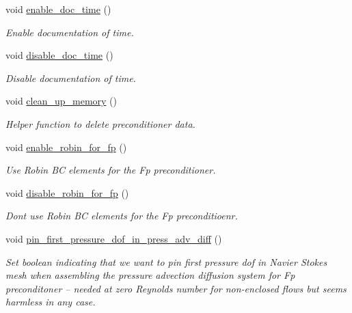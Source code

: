 \begin{DoxyCompactItemize}
void \hyperlink{classoomph_1_1NavierStokesSchurComplementPreconditioner_af1a6030468c5795b3ace7a58bcb6b4f1}{enable\+\_\+doc\+\_\+time} ()
\begin{DoxyCompactList}\small\item\em Enable documentation of time. \end{DoxyCompactList}\item 
void \hyperlink{classoomph_1_1NavierStokesSchurComplementPreconditioner_ae0015b71a33a147650606840d98f5a9e}{disable\+\_\+doc\+\_\+time} ()
\begin{DoxyCompactList}\small\item\em Disable documentation of time. \end{DoxyCompactList}\item 
void \hyperlink{classoomph_1_1NavierStokesSchurComplementPreconditioner_a5cac2493de85690e3954949eb2a27d2c}{clean\+\_\+up\+\_\+memory} ()
\begin{DoxyCompactList}\small\item\em Helper function to delete preconditioner data. \end{DoxyCompactList}\item 
void \hyperlink{classoomph_1_1NavierStokesSchurComplementPreconditioner_ac6554fd9418b705b70a0a54c0f864db8}{enable\+\_\+robin\+\_\+for\+\_\+fp} ()
\begin{DoxyCompactList}\small\item\em Use Robin BC elements for the Fp preconditioner. \end{DoxyCompactList}\item 
void \hyperlink{classoomph_1_1NavierStokesSchurComplementPreconditioner_ae1db0cf426cd70ad4f1f30182d82c469}{disable\+\_\+robin\+\_\+for\+\_\+fp} ()
\begin{DoxyCompactList}\small\item\em Don\textquotesingle{}t use Robin BC elements for the Fp preconditioenr. \end{DoxyCompactList}\item 
void \hyperlink{classoomph_1_1NavierStokesSchurComplementPreconditioner_af7d68718453adc8e7b9e19ad30cc9171}{pin\+\_\+first\+\_\+pressure\+\_\+dof\+\_\+in\+\_\+press\+\_\+adv\+\_\+diff} ()
\begin{DoxyCompactList}\small\item\em Set boolean indicating that we want to pin first pressure dof in Navier Stokes mesh when assembling the pressure advection diffusion system for Fp preconditoner -- needed at zero Reynolds number for non-\/enclosed flows but seems harmless in any case. \end{DoxyCompactList}\item 

\end{DoxyCompactItemize}
